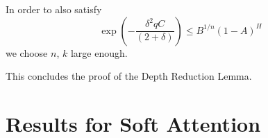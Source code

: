 \documentclass[11pt,a4paper]{article}
\begin{document}
In order to also satisfy
\begin{equation}
\exp\left(-\frac{\delta^2qC}{(2+\delta)}\right)  \leq B^{1/n} (1-A)^H
\end{equation}
we choose $n$, $k$ large enough. %

This concludes the proof of the Depth Reduction Lemma.





\section{Results for Soft Attention}


\end{document}
